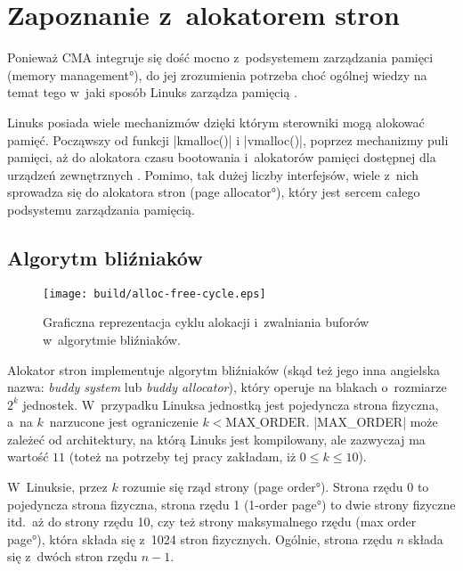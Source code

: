 \chapter{Zapoznanie z~alokatorem stron}

Ponieważ CMA integruje się dość mocno z~podsystemem zarządzania
pamięci (\ang{memory management}), do jej zrozumienia potrzeba
choć ogólnej wiedzy na temat tego w~jaki sposób Linuks zarządza
pamięcią .

Linuks posiada wiele mechanizmów dzięki którym sterowniki mogą
alokować pamięć.  Począwszy od funkcji \code|kmalloc()|
i \code|vmalloc()|, poprzez mechanizmy puli pamięci, aż do
alokatora czasu bootowania i~alokatorów pamięci dostępnej dla urządzeń
zewnętrznych \cite[rozdział 8]{bib:ldd3}.  Pomimo, tak dużej liczby
interfejsów, wiele z~nich sprowadza się do alokatora stron (\ang{page
  allocator}), który jest sercem całego podsystemu zarządzania
pamięcią.

\section{Algorytm bliźniaków}

\begin{wrapfigure}{o}[1.5cm]{0.3\textwidth}
\begin{center}
\texttt{[image: build/alloc-free-cycle.eps]}
\end{center}
\caption{Graficzna reprezentacja cyklu alokacji i~zwalniania buforów
  w~algorytmie bliźniaków.}
\end{wrapfigure}

Alokator stron implementuje algorytm bliźniaków (skąd też jego inna
angielska nazwa: {\it buddy system} lub {\it buddy allocator}), który
operuje na blakach o~rozmiarze $2^k$ jednostek.  W~przypadku Linuksa
jednostką jest pojedyncza strona fizyczna, a~na $k$~narzucone jest
ograniczenie $k < \mathrm{MAX\_ORDER}$.  \code|MAX_ORDER| może
zależeć od architektury, na którą Linuks jest kompilowany, ale
zazwyczaj ma wartość $11$ (toteż na potrzeby tej pracy zakładam, iż $0
\le k \le 10$).

W~Linuksie, przez $k$ rozumie się rząd strony (\ang{page order}).
Strona rzędu 0 to pojedyncza strona fizyczna, strona rzędu 1
(\ang{1-order page}) to dwie strony fizyczne itd.\ aż do strony rzędu
10, czy też strony maksymalnego rzędu (\ang{max order page}), która
składa się z~1024 stron fizycznych.  Ogólnie, strona rzędu $n$ składa
się z~dwóch stron rzędu $n-1$.


